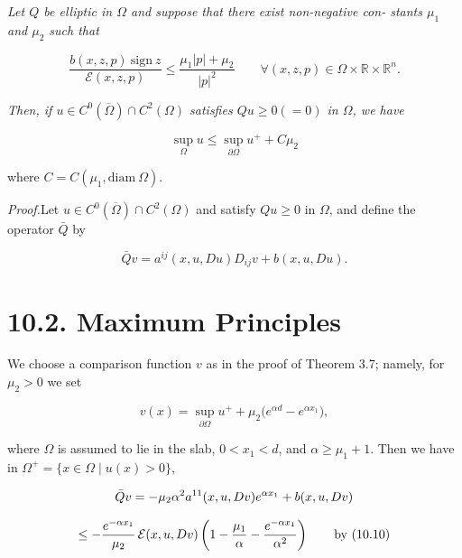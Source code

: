\begin{theorem}\label{gilbarg-trudinger.thm.10.3.apriori-bound}
\textit{Let $Q$ be elliptic in $\Omega$ and suppose that there exist non-negative con-
stants $\mu_1$ and $\mu_2$ such that}

\begin{equation}
\tag{10.10}
\frac{b(x,z,p)\ \mathrm{sign}\ z}{\mathcal{E}(x,z,p)} \le \frac{\mu_1 |p| + \mu_2}{|p|^2}
\qquad \forall(x,z,p) \in \Omega \times \mathbb{R} \times \mathbb{R}^n .
\end{equation}

\medskip

\noindent\textit{Then, if $u \in C^0(\overline{\Omega}) \cap C^2(\Omega)$ satisfies $Qu \ge 0(=0)$ in $\Omega$, we have}

\begin{equation}
\tag{10.11}
\sup_{\Omega} u \le \sup_{\partial \Omega} u^+ + C\mu_2
\end{equation}

\noindent where $C = C(\mu_1,\mathrm{diam}\ \Omega)$.

\medskip

\noindent\textit{Proof.}\enspace Let $u \in C^0(\overline{\Omega}) \cap C^2(\Omega)$ and satisfy $Qu \ge 0$ in $\Omega$, and define the operator
$\bar{Q}$ by

\[
\bar{Q}v = a^{ij}(x,u,Du)D_{ij}v + b(x,u,Du).
\]



\section*{10.2. Maximum Principles}

We choose a comparison function $v$ as in the proof of Theorem 3.7; namely, for
$\mu_2>0$ we set

\[
v(x)=\sup_{\partial\Omega} u^+ + \mu_2\bigl(e^{\alpha d}-e^{\alpha x_1}\bigr),
\]

where $\Omega$ is assumed to lie in the slab, $0<x_1<d$, and $\alpha\ge \mu_1+1$. Then we have in
$\Omega^+=\{x\in\Omega\mid u(x)>0\}$,

\[
\bar{Q} v=-\mu_2\alpha^2 a^{11}(x,u,Dv)e^{\alpha x_1}+b(x,u,Dv)
\]

\[
\le -\frac{e^{-\alpha x_1}}{\mu_2}\,\mathcal{E}(x,u,Dv)\left(1-\frac{\mu_1}{\alpha}-\frac{e^{-\alpha x_1}}{\alpha^2}\right)
\qquad \text{by (10.10)}
\]


\end{theorem}
